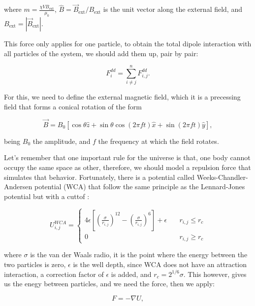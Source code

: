 where $m = \frac{\chi V B_{\text{ext}}}{\mu_0}$, $\hat{B} = \vec{B}_{\text{ext}}/B_{\text{ext}}$ is the unit vector along the external field, and $B_{\text{ext}} = |\vec{B}_{\text{ext}}|$. 

This force only applies for one particle, to obtain the total dipole interaction with all particles of the system, we should add them up, pair by pair:

\begin{equation}
  F^{dd}_i = \sum^{n}_{i \neq j} F^{dd}_{i,j}.  
  \label{eq:dipolesum}
\end{equation}

For this, we need to define the external magnetic field, which it is a precessing field that forms a conical rotation of the form

\begin{equation}
  \vec{B} = B_0 [\cos{\theta}\hat{z} + \sin{\theta}\cos{(2\pi f t)}\hat{x} + \sin{(2\pi f t)}\hat{y}],
  \label{eq:magneticfield}
\end{equation}

being $B_0$ the amplitude, and $f$ the frequency at which the field rotates.

Let's remember that one important rule for the universe is that, one body cannot occupy the same space as other, therefore, we should model a repulsion force that simulates that behavior. Fortunately, there is a potential called Weeks-Chandler-Andersen potential (WCA) that follow the same principle as the Lennard-Jones potential but with a cuttof \cite{hess1999augmented}:

\begin{equation}
  U_{i,j}^{WCA} = \begin{cases} 
    4\epsilon\left[ \left( \frac{\sigma}{r_{i,j}}\right)^{12} - \left( \frac{\sigma}{r_{i,j}}\right)^6\right] + \epsilon \quad &r_{i,j} \leq r_c \\
    0 \quad & r_{i,j} \geq r_c
  \end{cases}
  \label{eq:wcapotential}
\end{equation}

where $\sigma$ is the van der Waals radio, it is the point where the energy between the two particles is zero, $\epsilon$ is the well depth, since WCA does not have an attraction interaction, a correction factor of $\epsilon$ is added, and $r_c = 2^{1/6}\sigma$. This however, gives us the enegy between particles, and we need the force, then we apply:

\begin{equation}
 F = - \nabla U, 
  \label{eq:negativegradient}
\end{equation}

